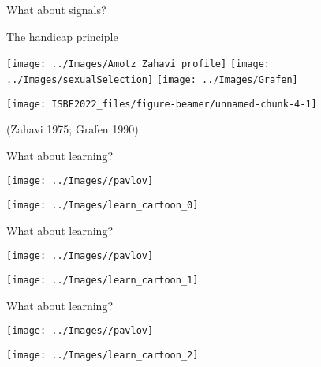 \documentclass[
  ignorenonframetext,
]{beamer}
\begin{document}
\begin{frame}{What about signals?}
\protect\hypertarget{what-about-signals}{}
\begin{block}{The handicap principle}
\protect\hypertarget{the-handicap-principle}{}
\begin{center}\texttt{[image: ../Images/Amotz\_Zahavi\_profile]} \texttt{[image: ../Images/sexualSelection]} \texttt{[image: ../Images/Grafen]} \end{center}

\begin{center}\texttt{[image: ISBE2022\_files/figure-beamer/unnamed-chunk-4-1]} \end{center}

(Zahavi 1975; Grafen 1990)
\end{block}
\end{frame}

\begin{frame}{What about learning?}
\protect\hypertarget{what-about-learning}{}
\begin{center}\texttt{[image: ../Images//pavlov]} \end{center}

\begin{center}\texttt{[image: ../Images/learn\_cartoon\_0]} \end{center}
\end{frame}

\begin{frame}{What about learning?}
\protect\hypertarget{what-about-learning-1}{}
\begin{center}\texttt{[image: ../Images//pavlov]} \end{center}

\begin{center}\texttt{[image: ../Images/learn\_cartoon\_1]} \end{center}
\end{frame}

\begin{frame}{What about learning?}
\protect\hypertarget{what-about-learning-2}{}
\begin{center}\texttt{[image: ../Images//pavlov]} \end{center}

\begin{center}\texttt{[image: ../Images/learn\_cartoon\_2]} \end{center}
\end{frame}
\end{document}
